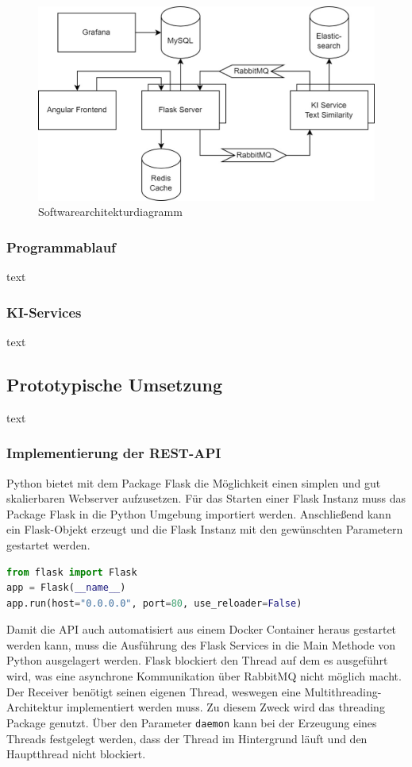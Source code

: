 \begin{figure}[H]
  \centering
    \includegraphics[width = 15cm]{bilder/Architektur}
    \caption{Softwarearchitekturdiagramm}
\end{figure}

\subsubsection{Programmablauf}
text
\subsubsection{KI-Services}
text 
\subsection{Prototypische Umsetzung}
text
\subsubsection{Implementierung der REST-API}
Python bietet mit dem Package Flask die Möglichkeit einen simplen und gut skalierbaren Webserver aufzusetzen. Für das Starten einer Flask Instanz muss das Package Flask in die Python Umgebung importiert werden. Anschließend kann ein Flask-Objekt erzeugt und die Flask Instanz mit den gewünschten Parametern gestartet werden.

\begin{lstlisting}[language=Python]
from flask import Flask
app = Flask(__name__)
app.run(host="0.0.0.0", port=80, use_reloader=False)
\end{lstlisting}

Damit die API auch automatisiert aus einem Docker Container heraus gestartet werden kann, muss die Ausführung des Flask Services in die Main Methode von Python ausgelagert werden. Flask blockiert den Thread auf dem es ausgeführt wird, was eine asynchrone Kommunikation über RabbitMQ nicht möglich macht. Der Receiver benötigt seinen eigenen Thread, weswegen eine Multithreading-Architektur implementiert werden muss. Zu diesem Zweck wird das threading Package genutzt. Über den Parameter \texttt{daemon} kann bei der Erzeugung eines Threads festgelegt werden, dass der Thread im Hintergrund läuft und den Hauptthread nicht blockiert.

